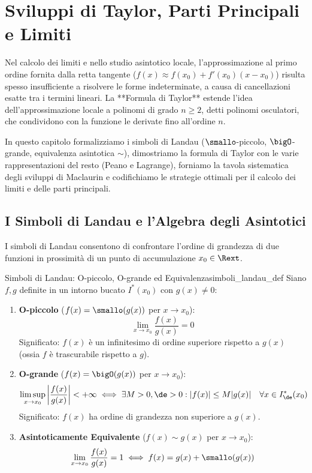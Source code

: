 \chapter{Sviluppi di Taylor, Parti Principali e Limiti}
\label{chap:taylor_sviluppi}

Nel calcolo dei limiti e nello studio asintotico locale, l'approssimazione al primo ordine fornita dalla retta tangente ($f(x) \approx f(x_0) + f'(x_0)(x - x_0)$) risulta spesso insufficiente a risolvere le forme indeterminate, a causa di cancellazioni esatte tra i termini lineari. La **Formula di Taylor** estende l'idea dell'approssimazione locale a polinomi di grado $n \ge 2$, detti polinomi osculatori, che condividono con la funzione le derivate fino all'ordine $n$.

In questo capitolo formalizziamo i simboli di Landau ($\smallo$-piccolo, $\bigO$-grande, equivalenza asintotica $\sim$), dimostriamo la formula di Taylor con le varie rappresentazioni del resto (Peano e Lagrange), forniamo la tavola sistematica degli sviluppi di Maclaurin e codifichiamo le strategie ottimali per il calcolo dei limiti e delle parti principali.

\section{I Simboli di Landau e l'Algebra degli Asintotici}
\label{sec:simboli_landau_teoria}

I simboli di Landau consentono di confrontare l'ordine di grandezza di due funzioni in prossimità di un punto di accumulazione $x_0 \in \Rext$.

\begin{definizione}{Simboli di Landau: O-piccolo, O-grande ed Equivalenza}{simboli_landau_def}
Siano $f, g$ definite in un intorno bucato $I^*(x_0)$ con $g(x) \neq 0$:
\begin{enumerate}
    \item \textbf{O-piccolo} ($f(x) = \smallo(g(x))$ per $x \to x_0$):
    \[
        \lim_{x \to x_0} \frac{f(x)}{g(x)} = 0
    \]
    Significato: $f(x)$ è un infinitesimo di ordine superiore rispetto a $g(x)$ (ossia $f$ è trascurabile rispetto a $g$).
    \item \textbf{O-grande} ($f(x) = \bigO(g(x))$ per $x \to x_0$):
    \[
        \limsup_{x \to x_0} \left|\frac{f(x)}{g(x)}\right| < +\infty \iff \exists M > 0, \de > 0 : |f(x)| \le M |g(x)| \quad \forall x \in I^*_\de(x_0)
    \]
    Significato: $f(x)$ ha ordine di grandezza non superiore a $g(x)$.
    \item \textbf{Asintoticamente Equivalente} ($f(x) \sim g(x)$ per $x \to x_0$):
    \[
        \lim_{x \to x_0} \frac{f(x)}{g(x)} = 1 \iff f(x) = g(x) + \smallo(g(x))
    \]
\end{enumerate}
\end{definizione}

